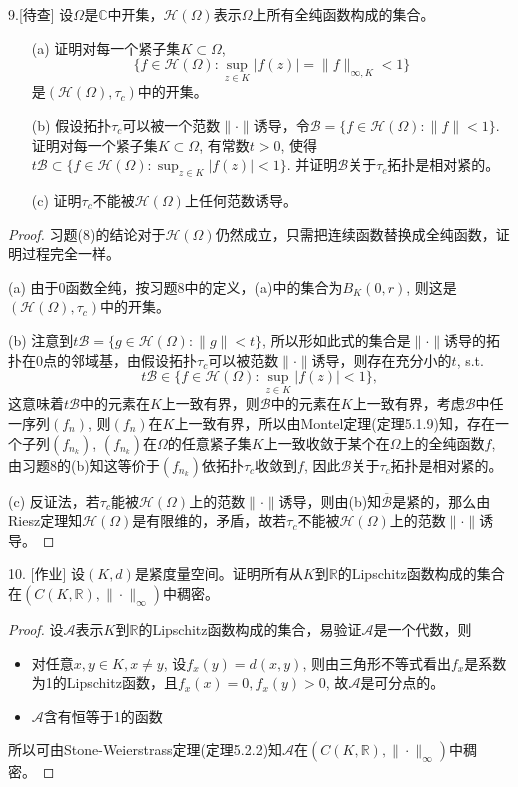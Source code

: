\documentclass[a4paper,8pt]{ctexart}\textwidth 140mm \textheight 216mm
\newcommand{\8}{\infty}
\begin{document}
9.[待查] 设$\Omega$是$\mathbb{C}$中开集，$\mathcal{H}(\Omega)$表示$\Omega$上所有全纯函数构成的集合。
\begin{enumerate}
	\item[(a)] 证明对每一个紧子集$K\subset\Omega$, 
	$$\{f\in \mathcal{H}(\Omega):\sup_{z\in K}|f(z)|=\|f\|_{\infty,K}<1\}$$
	是$(\mathcal{H}(\Omega),\tau_c)$中的开集。
	\item[(b)] 假设拓扑$\tau_c$可以被一个范数$\|\cdot\|$诱导，令$\mathcal{B}=\{f\in\mathcal{H}(\Omega):\|f\|<1\}$. 证明对每一个紧子集$K\subset \Omega$, 有常数$t>0$, 使得$t\mathcal{B}\subset\{f\in\mathcal{H}(\Omega):\sup_{z\in K}|f(z)|<1\}$. 并证明$\mathcal{B}$关于$\tau_c$拓扑是相对紧的。
	\item[(c)] 证明$\tau_c$不能被$\mathcal{H}(\Omega)$上任何范数诱导。
\end{enumerate}
\begin{proof}
	习题(8)的结论对于$\mathcal{H}(\Omega)$仍然成立，只需把连续函数替换成全纯函数，证明过程完全一样。
	
	(a) 由于0函数全纯，按习题8中的定义，(a)中的集合为$B_K(0,r)$, 则这是$(\mathcal{H}(\Omega),\tau_c)$中的开集。
	
	(b) 注意到$t\mathcal{B}=\{g\in\mathcal{H}(\Omega):\|g\|<t\}$, 所以形如此式的集合是$\|\cdot\|$诱导的拓扑在0点的邻域基，由假设拓扑$\tau_c$可以被范数$\|\cdot\|$诱导，则存在充分小的$t$, s.t. 
	$$t\mathcal{B}\in \{f\in\mathcal{H}(\Omega):\sup_{z\in K}|f(z)|<1\},$$
	这意味着$t\mathcal{B}$中的元素在$K$上一致有界，则$\mathcal{B}$中的元素在$K$上一致有界，考虑$\mathcal{B}$中任一序列$(f_n)$, 则$(f_n)$在$K$上一致有界，所以由Montel定理(定理5.1.9)知，存在一个子列$(f_{n_k})$, $(f_{n_k})$在$\Omega$的任意紧子集$K$上一致收敛于某个在$\Omega$上的全纯函数$f$,  由习题8的(b)知这等价于$(f_{n_k})$依拓扑$\tau_c$收敛到$f$,  因此$\mathcal{B}$关于$\tau_c$拓扑是相对紧的。
	
	(c) 反证法，若$\tau_c$能被$\mathcal{H}(\Omega)$上的范数$\|\cdot\|$诱导，则由(b)知$\overline{\mathcal{B}}$是紧的，那么由Riesz定理知$\mathcal{H}(\Omega)$是有限维的，矛盾，故若$\tau_c$不能被$\mathcal{H}(\Omega)$上的范数$\|\cdot\|$诱导。
\end{proof}

10. [作业] 设$(K,d)$是紧度量空间。证明所有从$K$到$\mathbb{R}$的Lipschitz函数构成的集合在$(C(K,\mathbb{R}),\|\cdot\|_\infty)$中稠密。
\begin{proof}
	设$\mathcal{A}$表示$K$到$\mathbb{R}$的Lipschitz函数构成的集合，易验证$\mathcal{A}$是一个代数，则
	\begin{itemize}
		\item 	对任意$x,y\in K, x\ne y$, 设$f_x(y)=d(x,y)$, 则由三角形不等式看出$f_x$是系数为1的Lipschitz函数，且$f_x(x)=0,f_x(y)>0$, 故$\mathcal{A}$是可分点的。
		\item  $\mathcal{A}$含有恒等于1的函数
	\end{itemize}
	所以可由Stone-Weierstrass定理(定理5.2.2)知$\mathcal{A}$在$(C(K,\mathbb{R}),\|\cdot\|_\infty)$中稠密。
\end{proof}            
\end{document}
